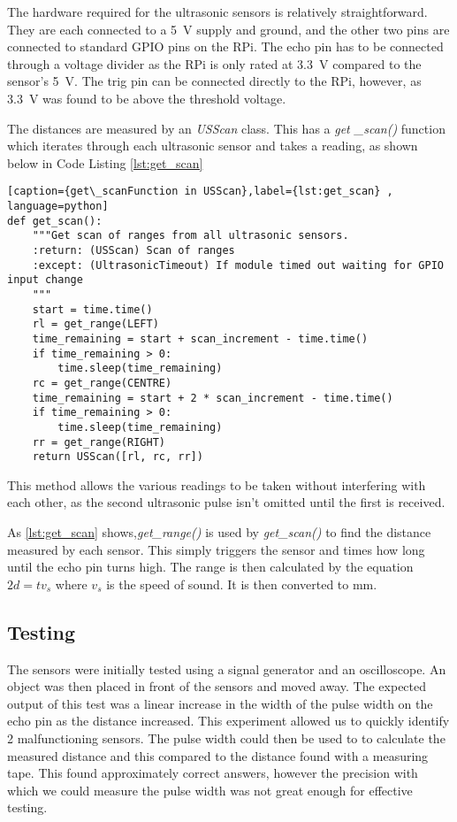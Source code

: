 The hardware required for the ultrasonic sensors is relatively straightforward. 
They are each connected to a \SI{5}{\volt} supply and ground, and the other two pins are 
connected to standard GPIO pins on the RPi. The echo pin has to be connected through 
a voltage divider as the RPi is only rated at \SI{3.3}{\volt} compared to the sensor's \SI{5}{\volt}. The 
trig pin can be connected directly to the RPi, however, as \SI{3.3}{\volt} was found to be above 
the threshold voltage.

The distances are measured by an \textit{USScan} class. This has a \textit{get
\_scan()} function which iterates through each ultrasonic sensor and takes a reading, 
as shown below in Code Listing \ref{lst:get_scan}

\begin{lstlisting}[caption={get\_scanFunction in USScan},label={lst:get_scan} , language=python]
def get_scan():
    """Get scan of ranges from all ultrasonic sensors.
    :return: (USScan) Scan of ranges
    :except: (UltrasonicTimeout) If module timed out waiting for GPIO input change
    """
    start = time.time()
    rl = get_range(LEFT)
    time_remaining = start + scan_increment - time.time()
    if time_remaining > 0:
        time.sleep(time_remaining)
    rc = get_range(CENTRE)
    time_remaining = start + 2 * scan_increment - time.time()
    if time_remaining > 0:
        time.sleep(time_remaining)
    rr = get_range(RIGHT)
    return USScan([rl, rc, rr])
\end{lstlisting}

This method allows the various readings to be taken without interfering with each other, as the second ultrasonic pulse isn't omitted until the first is received.

As \ref{lst:get_scan} shows,\textit{get\_range()} is used by
\textit{get\_scan()} to find the distance measured by each sensor.
This simply triggers the sensor and times how long until the echo
pin turns high. The range is then calculated by the equation
$ 2d = tv_s$ where $v_s$ is the speed of sound. It is then converted
to mm.

\subsection{Testing}\label{elec/range/test}
The sensors were initially tested using a signal generator and an
oscilloscope. An object was then placed in front of the sensors
and moved away. The expected output of this test was a linear increase
in the width of the pulse width on the echo pin as the distance
increased. This experiment allowed us to quickly identify 2
malfunctioning sensors. The pulse width could then be used to to
calculate the measured distance and this compared to the distance
found with a measuring tape. This found approximately correct answers,
however the precision with which we could measure the pulse width was
not great enough for effective testing.

